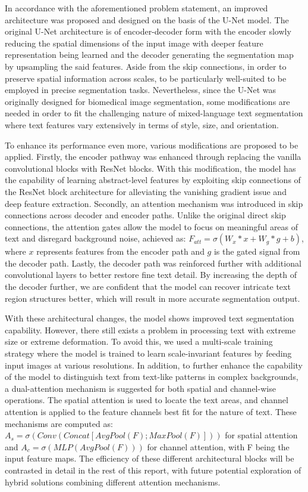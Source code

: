 \documentclass[10pt,twocolumn,letterpaper]{article}
\begin{document}
In accordance with the aforementioned problem statement, an improved architecture was proposed and designed on the basis of the U-Net model. 
The original U-Net architecture is of encoder-decoder form with the encoder slowly reducing the spatial dimensions of the input image with 
deeper feature representation being learned and the decoder generating the segmentation map by upsampling the said features. 
Aside from the skip connections, in order to preserve spatial information across scales, to be particularly well-suited to be employed 
in precise segmentation tasks. Nevertheless, since the U-Net was originally designed for biomedical image segmentation, 
some modifications are needed in order to fit the challenging nature of mixed-language text segmentation where text features 
vary extensively in terms of style, size, and orientation.

To enhance its performance even more, various modifications are proposed to be applied. Firstly, the encoder pathway was enhanced through replacing 
the vanilla convolutional blocks with ResNet blocks. With this modification, the model has the capability of learning abstract-level features 
by exploiting skip connections of the ResNet block architecture for alleviating the vanishing gradient issue and deep feature extraction. 
Secondly, an attention mechanism was introduced in skip connections across decoder and encoder paths. Unlike the original direct skip connections, 
the attention gates allow the model to focus on meaningful areas of text and disregard background noise, 
achieved as: $F_{att} = \sigma(W_x * x + W_g * g + b)$, where $x$ represents features from the encoder path and $g$ is the gated signal from the decoder path. 
Lastly, the decoder path was reinforced further with additional convolutional layers to better restore fine text detail. 
By increasing the depth of the decoder further, we are confident that the model can recover intricate text region structures better, 
which will result in more accurate segmentation output.

With these architectural changes, the model shows improved text segmentation capability. However, there still exists a problem 
in processing text with extreme size or extreme deformation. To avoid this, we used a multi-scale training strategy where the model is trained 
to learn scale-invariant features by feeding input images at various resolutions. In addition, to further enhance the capability of the model 
to distinguish text from text-like patterns in complex backgrounds, a dual-attention mechanism is suggested for both spatial and channel-wise operations. 
The spatial attention is used to locate the text areas, and channel attention is applied to the feature channels best fit for the nature of text. 
These mechanisms are computed as: $A_s = \sigma(Conv(Concat[AvgPool(F); MaxPool(F)]))$ for spatial attention and $A_c = \sigma(MLP(AvgPool(F)))$ 
for channel attention, with F being the input feature maps. The efficiency of these different architectural blocks will be contrasted 
in detail in the rest of this report, with future potential exploration of hybrid solutions combining different attention mechanisms.
\end{document}
